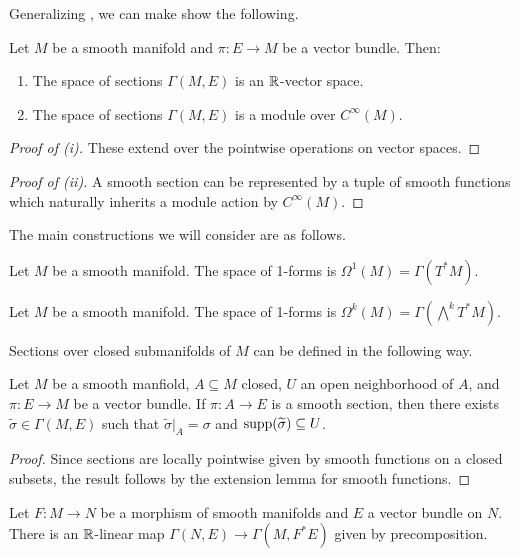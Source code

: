 Generalizing , we can make show the following. 
\begin{lemma}\label{lem: linear algebra of space of sections}
    Let $M$ be a smooth manifold and $\pi:E\to M$ be a vector bundle. Then:
    \begin{enumerate}[label=(\roman*)]
        \item The space of sections $\Gamma(M,E)$ is an $\mathbb{R}$-vector space. 
        \item The space of sections $\Gamma(M,E)$ is a module over $C^{\infty}(M)$. 
    \end{enumerate}
\end{lemma}
\begin{proof}[Proof of (i)]
    These extend over the pointwise operations on vector spaces. 
\end{proof}
\begin{proof}[Proof of (ii)]
    A smooth section can be represented by a tuple of smooth functions which naturally inherits a module action by $C^{\infty}(M)$.
\end{proof}
The main constructions we will consider are as follows. 
\begin{definition}[1-Form]\label{def: 1-form}
    Let $M$ be a smooth manifold. The space of 1-forms is $\Omega^{1}(M)=\Gamma(T^{*}M)$. 
\end{definition}
\begin{definition}[$k$-Form]\label{def: k-form}
    Let $M$ be a smooth manifold. The space of 1-forms is $\Omega^{k}(M)=\Gamma(\bigwedge^{k}T^{*}M)$.
\end{definition}
Sections over closed submanifolds of $M$ can be defined in the following way. 
\begin{lemma}\label{lem: sections of vector bundles over smooth closed submanifolds}
    Let $M$ be a smooth manfiold, $A\subseteq M$ closed, $U$ an open neighborhood of $A$, and $\pi:E\to M$ be a vector bundle. If $\pi:A\to E$ is a smooth section, then there exists $\widetilde{\sigma}\in\Gamma(M,E)$ such that $\widetilde{\sigma}|_{A}=\sigma$ and $\mathrm{supp}(\widetilde{\sigma})\subseteq U$. 
\end{lemma}
\begin{proof}
    Since sections are locally pointwise given by smooth functions on a closed subsets, the result follows by the extension lemma for smooth functions. 
\end{proof}
\begin{lemma}\label{lem: R-linear map on sections by precomposition}
    Let $F:M\to N$ be a morphism of smooth manifolds and $E$ a vector bundle on $N$. There is an $\mathbb{R}$-linear map $\Gamma(N,E)\to\Gamma(M,F^{*}E)$ given by precomposition. 
\end{lemma}
